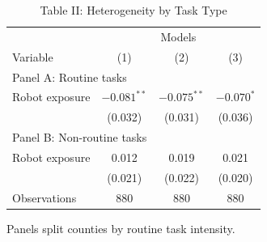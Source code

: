 \begin{table}[htbp]
\centering
\caption{Table II: Heterogeneity by Task Type}
\begin{threeparttable}
\begin{tabular}{lccc}
\toprule
 & \multicolumn{3}{c}{Models} \\
Variable & (1) & (2) & (3) \\
\midrule
\multicolumn{4}{l}{Panel A: Routine tasks} \\
Robot exposure & $-0.081^{**}$ & $-0.075^{**}$ & $-0.070^{*}$ \\
 & (0.032) & (0.031) & (0.036) \\
\multicolumn{4}{l}{Panel B: Non-routine tasks} \\
Robot exposure & 0.012 & 0.019 & 0.021 \\
 & (0.021) & (0.022) & (0.020) \\
Observations & 880 & 880 & 880 \\
\bottomrule
\end{tabular}
\begin{tablenotes}[flushleft]
\item Panels split counties by routine task intensity.
\end{tablenotes}
\end{threeparttable}
\end{table}
